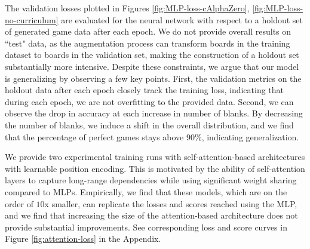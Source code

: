\documentclass[10pt, reqno, letterpaper, twoside]{amsart}
\begin{document}
The validation losses plotted in Figures \ref{fig:MLP-loss-cAlphaZero}, \ref{fig:MLP-loss-no-curriculum} are evaluated for the neural network with respect to a holdout set of generated game data after each epoch. We do not provide overall results on ``test" data, as the augmentation process can transform boards in the training dataset to boards in the validation set, making the construction of a holdout set substantially more intensive. Despite these constraints, we argue that our model is generalizing by observing a few key points. First, the validation metrics on the holdout data after each epoch closely track the training loss, indicating that during each epoch, we are not overfitting to the provided data. Second, we can observe the drop in accuracy at each increase in number of blanks. By decreasing the number of blanks, we induce a shift in the overall distribution, and we find that the percentage of perfect games stays above $90\%$, indicating generalization.

We provide two experimental training runs with self-attention-based architectures with learnable position encoding. This is motivated by the ability of self-attention layers to capture long-range dependencies while using significant weight sharing compared to MLPs. Empirically, we find that these models, which are on the order of $10$x smaller, can replicate the losses and scores reached using the MLP, and we find that increasing the size of the attention-based architecture does not provide substantial improvements. See corresponding loss and score curves in Figure \ref{fig:attention-loss} in the Appendix.
\end{document}
